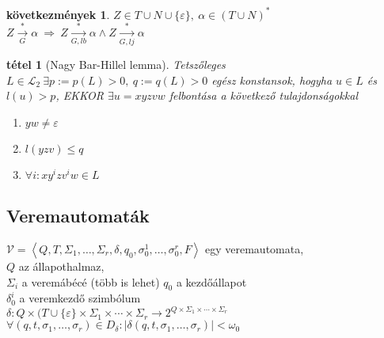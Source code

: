 \documentclass[fleqn,10pt,a4paper]{article}
\newcommand{\nn}{\Rightarrow}
\renewcommand{\epsilon}{\varepsilon}
\newcommand{\listazjromai}{
  \renewcommand{\theenumi}{\roman{enumi}}
  \renewcommand{\labelenumi}{(\theenumi)}
}
\newenvironment{enumzjromai}{\listazjromai\begin{enumerate}}{\end{enumerate}}
\newenvironment{enumzjr}{\begin{enumzjromai}}{\end{enumzjromai}}
\theoremstyle{magyar}
\newtheorem{te}{tétel}[section]
\newtheorem{ko}{következmények}[section]
\newcommand{\Lang}{\mathcal{L}}
\begin{document}
  \begin{ko}
    $Z\in T\cup N\cup \{\epsilon\},\ \alpha\in (T\cup N)^*$ \\
    $Z\xrightarrow[G]{*}\alpha\ \nn\  Z\xrightarrow[G,lb]{*}\alpha \land Z\xrightarrow[G,lj]{*}\alpha$
  \end{ko}

  \begin{te}[Nagy Bar-Hillel lemma]
    Tetszőleges $L\in \Lang_2\ \exists p:= p(L) > 0,\ q:=q(L)>0$ egész konstansok, hogyha $u\in L$ és $l(u)>p$, EKKOR
    $\exists u = xyzvw$ felbontása a következő tulajdonságokkal
    \begin{enumzjr}
    \item $yw\neq \epsilon$
    \item $l(yzv) \leq q$
    \item $\forall i\colon xy^izv^iw\in L$
    \end{enumzjr}
  \end{te}
  
  \subsection{Veremautomaták}
  
  $\mathcal {V} = \left< Q, T , \Sigma_1,\ldots,\Sigma_r, \delta, q_0, \sigma_0^1,\ldots, \sigma_0^r, F\right>$ egy
  veremautomata,\\
  $Q$ az állapothalmaz,\\
  $\Sigma_i$ a veremábécé (több is lehet)
  $q_0$ a kezdőállapot\\
  $\delta_0^i$ a veremkezdő szimbólum\\
  $\delta\colon Q\times (T\cup \{\epsilon \} \times \Sigma_1\times\dotsb\times \Sigma_r\to 2^{Q\times\Sigma_1
    \times\dotsb\times \Sigma_r}$\\
  $\forall (q,t,\sigma_1,\ldots, \sigma_r) \in D_\delta\colon |\delta(q,t,\sigma_1,\ldots, \sigma_r)| < \omega_0$
  
\end{document}
